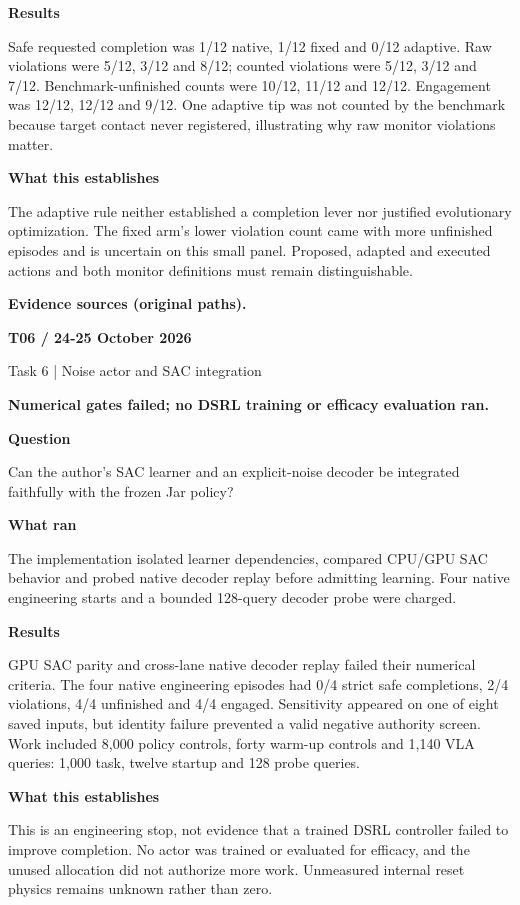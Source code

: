 \documentclass[11pt,a4paper]{article}
\newcommand{\block}[2]{\par\textbf{\color{ink}#1}\par\nopagebreak #2\par}
\newcommand{\finding}[1]{\begin{tcolorbox}[colback=pale,colframe=pale,boxrule=0pt,arc=1mm,left=10pt,right=10pt,top=10pt,bottom=10pt]\color{ink}\large\bfseries #1\end{tcolorbox}}
\begin{document}
\block{Results}{Safe requested completion was 1/12 native, 1/12 fixed and 0/12 adaptive. Raw violations were 5/12, 3/12 and 8/12; counted violations were 5/12, 3/12 and 7/12. Benchmark-unfinished counts were 10/12, 11/12 and 12/12. Engagement was 12/12, 12/12 and 9/12. One adaptive tip was not counted by the benchmark because target contact never registered, illustrating why raw monitor violations matter.}
\block{What this establishes}{The adaptive rule neither established a completion lever nor justified evolutionary optimization. The fixed arm's lower violation count came with more unfinished episodes and is uncertain on this small panel. Proposed, adapted and executed actions and both monitor definitions must remain distinguishable.}
\vfill{\footnotesize\color{muted}\textbf{Evidence sources (original paths).}\par
\raggedright {}\par {}}
\clearpage
{}\label{exp:T06}
{\color{accent}\small\bfseries T06 / 24-25 October 2026}\par
{}\par
{\color{muted}\small Task 6 | Noise actor and SAC integration}\par\vspace{2mm}
\finding{Numerical gates failed; no DSRL training or efficacy evaluation ran.}
\block{Question}{Can the author's SAC learner and an explicit-noise decoder be integrated faithfully with the frozen Jar policy?}
\block{What ran}{The implementation isolated learner dependencies, compared CPU/GPU SAC behavior and probed native decoder replay before admitting learning. Four native engineering starts and a bounded 128-query decoder probe were charged.}
\block{Results}{GPU SAC parity and cross-lane native decoder replay failed their numerical criteria. The four native engineering episodes had 0/4 strict safe completions, 2/4 violations, 4/4 unfinished and 4/4 engaged. Sensitivity appeared on one of eight saved inputs, but identity failure prevented a valid negative authority screen. Work included 8,000 policy controls, forty warm-up controls and 1,140 VLA queries: 1,000 task, twelve startup and 128 probe queries.}
\block{What this establishes}{This is an engineering stop, not evidence that a trained DSRL controller failed to improve completion. No actor was trained or evaluated for efficacy, and the unused allocation did not authorize more work. Unmeasured internal reset physics remains unknown rather than zero.}
\end{document}
